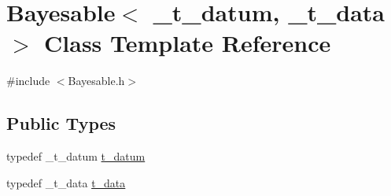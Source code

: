 \hypertarget{class_bayesable}{}\section{Bayesable$<$ \+\_\+t\+\_\+datum, \+\_\+t\+\_\+data $>$ Class Template Reference}
\label{class_bayesable}


{\ttfamily \#include $<$Bayesable.\+h$>$}

\subsection*{Public Types}
\begin{DoxyCompactItemize}
\item 
typedef \+\_\+t\+\_\+datum \hyperlink{class_bayesable_a7c93a2eeab708378eb321745908718d4}{t\+\_\+datum}
\item 
typedef \+\_\+t\+\_\+data \hyperlink{class_bayesable_a70a593a67c7d43239ecc06bb4fd06a6b}{t\+\_\+data}
\end{DoxyCompactItemize}
